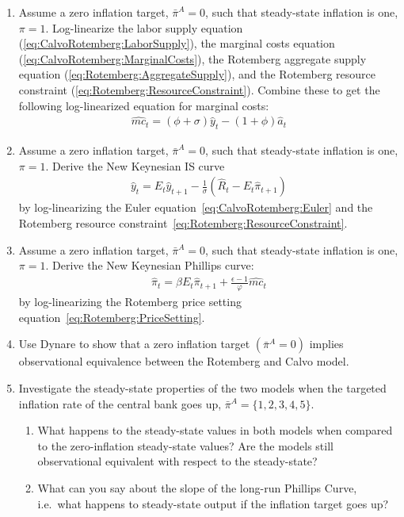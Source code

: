 \documentclass{article}
\numberwithin{equation}{section}
\begin{document}
\begin{enumerate}

\item Assume a zero inflation target, \(\bar{\pi}^{A}=0\), such that steady-state inflation is one, \(\pi = 1\).
Log-linearize the labor supply equation (\ref{eq:CalvoRotemberg:LaborSupply}),
  the marginal costs equation (\ref{eq:CalvoRotemberg:MarginalCosts}),
  the Rotemberg aggregate supply equation (\ref{eq:Rotemberg:AggregateSupply}),
  and the Rotemberg resource constraint (\ref{eq:Rotemberg:ResourceConstraint}).
Combine these to get the following log-linearized equation for marginal costs:
\begin{align}
\hat{mc}_t = (\phi+\sigma) \hat{y}_t - (1+\phi) \hat{a}_t \label{eq:LogLinearization.MarginalCosts}
\end{align}

\item Assume a zero inflation target, \(\bar{\pi}^{A}=0\), such that steady-state inflation is one, \(\pi = 1\).
Derive the New Keynesian IS curve
\begin{align*}
\hat{y}_t = E_{t} \hat{y}_{t+1} - \frac{1}{\sigma} \left( \hat{R}_t - E_{t} \hat{\pi}_{t+1} \right)
\end{align*}
by log-linearizing the Euler equation~\eqref{eq:CalvoRotemberg:Euler}
and the Rotemberg resource constraint~\eqref{eq:Rotemberg:ResourceConstraint}.

\item Assume a zero inflation target, \(\bar{\pi}^{A}=0\), such that steady-state inflation is one, \(\pi = 1\).
Derive the New Keynesian Phillips curve:
\begin{align*}
\hat{\pi}_t = \beta E_{t} \hat{\pi}_{t+1} + \frac{\epsilon-1}{\varphi} \hat{mc}_t
\end{align*}
by log-linearizing the Rotemberg price setting equation~\eqref{eq:Rotemberg:PriceSetting}.

\item Use Dynare to show that a zero inflation target \((\bar{\pi}^{A}=0)\) implies observational equivalence between the Rotemberg and Calvo model.

\item Investigate the steady-state properties of the two models when the targeted inflation rate of the central bank goes up, \(\bar{\pi}^{A} = \{1, 2, 3, 4, 5\} \).

\begin{enumerate}
  \item What happens to the steady-state values in both models when compared to the zero-inflation steady-state values?
  Are the models still observational equivalent with respect to the steady-state?
  \item What can you say about the slope of the long-run Phillips Curve, i.e.\ what happens to steady-state output if the inflation target goes up?
\end{enumerate}


\end{enumerate}
\end{document}
